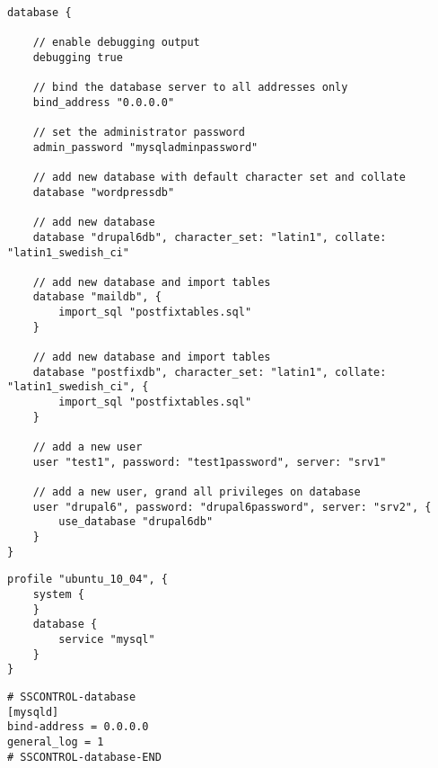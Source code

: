 
\begin{lstlisting}[style=Java,label=lst:database_example_script,
title={Example script for a database. It will set the database server address, create four databases and two users.}]
database {

    // enable debugging output
    debugging true

    // bind the database server to all addresses only
    bind_address "0.0.0.0"

    // set the administrator password
    admin_password "mysqladminpassword"

    // add new database with default character set and collate
    database "wordpressdb"

    // add new database
    database "drupal6db", character_set: "latin1", collate: "latin1_swedish_ci"

    // add new database and import tables
    database "maildb", {
        import_sql "postfixtables.sql"
    }

    // add new database and import tables
    database "postfixdb", character_set: "latin1", collate: "latin1_swedish_ci", {
        import_sql "postfixtables.sql"
    }

    // add a new user
    user "test1", password: "test1password", server: "srv1"

    // add a new user, grand all privileges on database
    user "drupal6", password: "drupal6password", server: "srv2", {
        use_database "drupal6db"
    }
}
\end{lstlisting}

\begin{lstlisting}[style=Java,label=lst:database_ubuntu_profile_min,
title={Minimal Ubuntu database profile, only the database type is needed. The other profile properties are set to default values.}]
profile "ubuntu_10_04", {
    system {
    }
    database {
        service "mysql"
    }
}
\end{lstlisting}

\begin{lstlisting}[style=rcfile_nonumbers,
label=lst:database_maincf_example,
title={Example MySQL server configuration file that is created from the database profile.
The file is saved as /etc/mysql/conf.d/sscontrol\_mysqld.cnf}]
# SSCONTROL-database
[mysqld]
bind-address = 0.0.0.0
general_log = 1
# SSCONTROL-database-END
\end{lstlisting}

